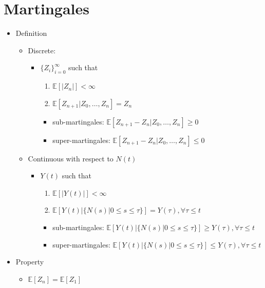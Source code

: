 \documentclass[a4paper]{article}
\begin{document}
\section{Martingales}
\begin{itemize}
    \item Definition
        \begin{itemize}
            \item Discrete:
                \begin{itemize}
                    \item $\{Z_i\}_{i=0}^\infty$ such that
                        \begin{enumerate}
                            \item $\mathbb{E}[|Z_n|] < \infty$
                            \item $\mathbb{E}[Z_{n+1}| Z_0, \dots, Z_n] = Z_n$
                        \end{enumerate}
                        \begin{itemize}
                            \item sub-martingales: $\mathbb{E}[Z_{n+1} - Z_n| Z_0, \dots, Z_n] \geq 0$
                            \item super-martingales: $\mathbb{E}[Z_{n+1} - Z_n| Z_0, \dots, Z_n] \leq 0$
                        \end{itemize}
                \end{itemize}
            \item Continuous with respect to $N(t)$
                \begin{itemize}
                    \item $Y(t)$ such that
                        \begin{enumerate}
                            \item $\mathbb{E}[|Y(t)|] < \infty$
                            \item $\mathbb{E}[Y(t)| \{N(s) | 0 \leq s \leq \tau\}] = Y(\tau), \forall \tau \leq t$
                        \end{enumerate}
                        \begin{itemize}
                            \item sub-martingales: $\mathbb{E}[Y(t)| \{N(s) | 0 \leq s \leq \tau\}] \geq Y(\tau), \forall \tau \leq t$
                            \item super-martingales: $\mathbb{E}[Y(t)| \{N(s) | 0 \leq s \leq \tau\}] \leq Y(\tau), \forall \tau \leq t$
                        \end{itemize}
                \end{itemize}
        \end{itemize}
    \item Property
        \begin{itemize}
            \item $\mathbb{E}[Z_n] = \mathbb{E}[Z_1]$


\end{itemize}
\end{itemize}
\end{document}
